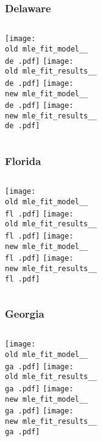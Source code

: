 \documentclass{beamer}
\newcommand{\old}{api-370-prod/pyseir/state_summaries/reports/}
\newcommand{\new}{new/pyseir/state_summaries/reports/}
\newcommand{\de}{Delaware__10}
\newcommand{\fl}{Florida__12}
\newcommand{\ga}{Georgia__13}
\begin{document}
\begin{frame}
\frametitle{Delaware}
    \begin{columns}[t]
       \texttt{[image: \\old mle\_fit\_model\_\_\\de .pdf]}
       \texttt{[image: \\old mle\_fit\_results\_\_\\de .pdf]}   
       \texttt{[image: \\new mle\_fit\_model\_\_\\de .pdf]}
       \texttt{[image: \\new mle\_fit\_results\_\_\\de .pdf]}   
\end{columns}
\end{frame}


\begin{frame}
\frametitle{Florida}
    \begin{columns}[t]
       \texttt{[image: \\old mle\_fit\_model\_\_\\fl .pdf]}
       \texttt{[image: \\old mle\_fit\_results\_\_\\fl .pdf]}   
       \texttt{[image: \\new mle\_fit\_model\_\_\\fl .pdf]}
       \texttt{[image: \\new mle\_fit\_results\_\_\\fl .pdf]}   
\end{columns}
\end{frame}

\begin{frame}
\frametitle{Georgia}
    \begin{columns}[t]

       \texttt{[image: \\old mle\_fit\_model\_\_\\ga .pdf]}
       \texttt{[image: \\old mle\_fit\_results\_\_\\ga .pdf]}   
       \texttt{[image: \\new mle\_fit\_model\_\_\\ga .pdf]}
       \texttt{[image: \\new mle\_fit\_results\_\_\\ga .pdf]}   
       
\end{columns}
\end{frame}
\end{document}
